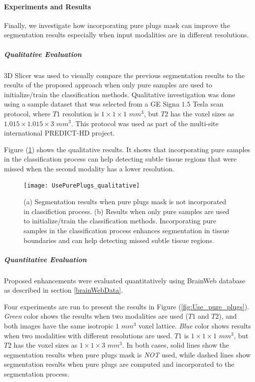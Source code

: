 \paragraph{Experiments and Results}

Finally, we investigate how incorporating pure plugs mask can improve the segmentation results especially when input modalities are in different resolutions.

\subparagraph{Qualitative Evaluation} %

3D Slicer \cite{slicer_paper} was used to visually compare the previous segmentation results to the results of the proposed approach when only pure samples are used to initialize/train the classification methods.
Qualitative investigation was done using a sample dataset that was selected from a GE Signa $1.5$ Tesla scan protocol, where $T1$ resolution is $1 \times 1 \times 1$ $mm^3$, but $T2$ has the voxel sizes as $1.015 \times 1.015 \times 3$ $mm^3$.
This protocol was used as part of the multi-site international PREDICT-HD \cite{PREDICTHD} project.

Figure (\ref{fig:UsePurePlugs_qualitative}) shows the qualitative results. It shows that incorporating pure samples in the classification process can help detecting subtle tissue regions that were missed when the second modality has a lower resolution.

\begin{figure}
\centering
\texttt{[image: UsePurePlugs\_qualitative]}\
\centering
\caption{(a) Segmentation results when pure plugs mask is not incorporated in classifiction process. (b) Results when only pure samples are used to initialize/train the classification methods. Incorporating pure samples in the classification process enhances segmentation in tissue boundaries and can help detecting missed subtle tissue regions.}
\label{fig:UsePurePlugs_qualitative}
\end{figure}

\subparagraph{Quantitative Evaluation} %

Proposed enhancements were evaluated quantitatively using BrainWeb database as described in section \ref{brainWebData}.

Four experiments are run to present the results in Figure (\ref{fig:Use_pure_plugs}). \textit{Green} color shows the results when two modalities are used ($T1$ and $T2$), and both images have the same isotropic $1$ $mm^3$ voxel lattice. 
\textit{Blue} color shows results when two modalities with different resolutions are used. $T1$ is $1 \times 1 \times 1$ $mm^3$, but $T2$ has the voxel sizes as $1 \times 1 \times 3$ $mm^3$.
In both cases, solid lines show the segmentation results when pure plugs mask is \textit{NOT} used, while dashed lines show segmentation results when pure plugs are computed and incorporated to the segmentation process.

